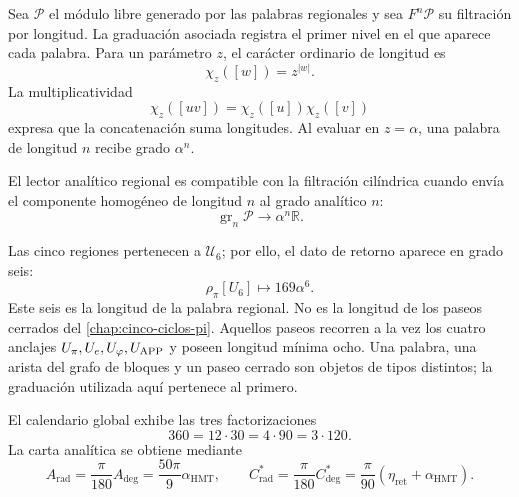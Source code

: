 
Sea \(\mathcal P\) el módulo libre generado por las palabras regionales y
sea \(F^n\mathcal P\) su filtración por longitud. La graduación asociada
registra el primer nivel en el que aparece cada palabra. Para un parámetro
\(z\), el carácter ordinario de longitud es
\[
\chi_z([w])=z^{|w|}.
\]
La multiplicatividad
\[
\chi_z([uv])=\chi_z([u])\chi_z([v])
\]
expresa que la concatenación suma longitudes. Al evaluar en
\(z=\alpha\), una palabra de longitud \(n\) recibe grado \(\alpha^n\).

\begin{definition}
\label{p3-20260826:def:compatibilidad-grado}
El lector analítico regional es compatible con la filtración cilíndrica
cuando envía el componente homogéneo de longitud \(n\) al grado analítico
\(n\):
\[
\operatorname{gr}_n\mathcal P\longrightarrow
\alpha^n\mathbb R.
\]
\end{definition}

Las cinco regiones pertenecen a \(\mathcal U_6\); por ello, el dato de
retorno aparece en grado seis:
\[
\rho_\pi[U_6]\longmapsto169\alpha^6.
\]
Este seis es la longitud de la palabra regional. No es la longitud de los
paseos cerrados del \cref{chap:cinco-ciclos-pi}. Aquellos paseos recorren a
la vez los cuatro anclajes
\(U_\pi,U_e,U_\varphi,U_{\rm APP}\) y poseen longitud mínima ocho. Una
palabra, una arista del grafo de bloques y un paseo cerrado son objetos de
tipos distintos; la graduación utilizada aquí pertenece al primero.

El calendario global exhibe las tres factorizaciones
\begin{equation}
 360=12\cdot30=4\cdot90=3\cdot120.
 \label{eq:l9s102:360-factorizaciones}
\end{equation}
La carta analítica se obtiene mediante
\begin{equation}
 A_{\mathrm{rad}}=\frac\pi{180}A_{\deg}
 =\frac{50\pi}{9}\alpha_{\mathrm{HMT}},
 \qquad
 C^*_{\mathrm{rad}}=\frac\pi{180}C^*_{\deg}
 =\frac\pi{90}(\eta_{\mathrm{ret}}+\alpha_{\mathrm{HMT}}).
 \label{eq:l9s102:a-cstar-rad}
\end{equation}

